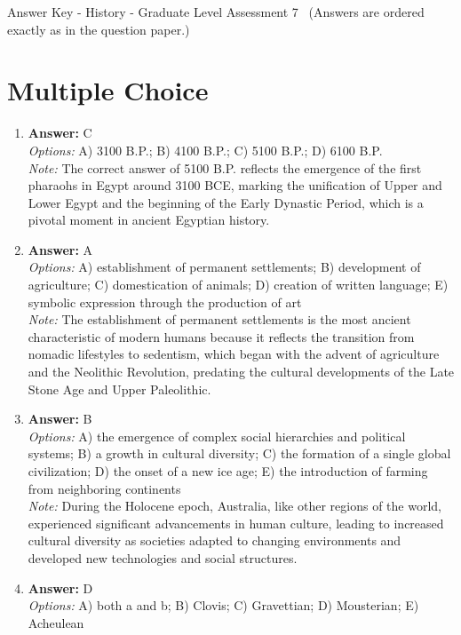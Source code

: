 \documentclass[12pt]{article}
\begin{document}
\begin{center}
Answer Key - History - Graduate Level Assessment 7 \
\small (Answers are ordered exactly as in the question paper.)
\end{center}

\section*{Multiple Choice}
\begin{enumerate}[label=\arabic*.]
\item \textbf{Answer:} C
\\ \textit{Options:} A) 3100 B.P.; B) 4100 B.P.; C) 5100 B.P.; D) 6100 B.P.
\\ \textit{Note:} The correct answer of 5100 B.P. reflects the emergence of the first pharaohs in Egypt around 3100 BCE, marking the unification of Upper and Lower Egypt and the beginning of the Early Dynastic Period, which is a pivotal moment in ancient Egyptian history.
\item \textbf{Answer:} A
\\ \textit{Options:} A) establishment of permanent settlements; B) development of agriculture; C) domestication of animals; D) creation of written language; E) symbolic expression through the production of art
\\ \textit{Note:} The establishment of permanent settlements is the most ancient characteristic of modern humans because it reflects the transition from nomadic lifestyles to sedentism, which began with the advent of agriculture and the Neolithic Revolution, predating the cultural developments of the Late Stone Age and Upper Paleolithic.
\item \textbf{Answer:} B
\\ \textit{Options:} A) the emergence of complex social hierarchies and political systems; B) a growth in cultural diversity; C) the formation of a single global civilization; D) the onset of a new ice age; E) the introduction of farming from neighboring continents
\\ \textit{Note:} During the Holocene epoch, Australia, like other regions of the world, experienced significant advancements in human culture, leading to increased cultural diversity as societies adapted to changing environments and developed new technologies and social structures.
\item \textbf{Answer:} D
\\ \textit{Options:} A) both a and b; B) Clovis; C) Gravettian; D) Mousterian; E) Acheulean

\end{enumerate}
\end{document}
